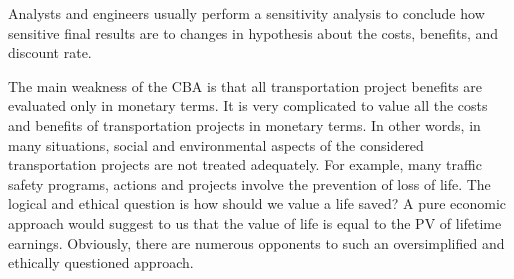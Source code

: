 \par
Analysts and engineers usually perform a sensitivity analysis to conclude how sensitive final results are to changes in hypothesis about the costs, benefits, and discount rate.\\
\par
The main weakness of the CBA is that all transportation project benefits are evaluated only in monetary terms. It is very complicated to value all the costs and benefits of transportation projects in monetary terms. In other words, in many situations, social and environmental aspects of the considered transportation projects are not treated adequately. For example, many traffic safety programs, actions and projects involve the prevention of loss of life. The logical and ethical question is how should we value a life saved? A pure economic approach would suggest to us that the value of life is equal to the PV of lifetime earnings. Obviously, there are numerous opponents to such an oversimplified and ethically questioned approach.\\
%
